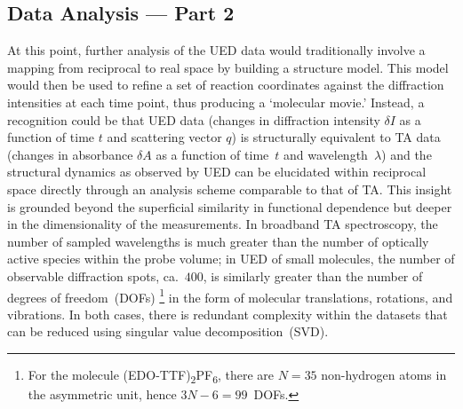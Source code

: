 \subsection{Data Analysis --- Part 2}
\label{sec: UED-data-analysis-2}

At this point, further analysis of the UED data would traditionally involve
a mapping from reciprocal to real space by building a structure model.
This model would then be used to refine a set of reaction coordinates against
the diffraction intensities at each time point, thus producing a `molecular movie.'
%
Instead, a recognition could be that UED data
(changes in diffraction intensity $\delta I$ as a function of time $t$ and scattering vector $q$)
is structurally equivalent to TA data (changes in absorbance $\delta A$ as a function of time~$t$ and wavelength~$\lambda$)
and the structural dynamics as observed by UED can be elucidated within reciprocal space directly
through an analysis scheme comparable to that of TA.
%
This insight is grounded beyond the superficial similarity in functional dependence
but deeper in the dimensionality of the measurements.
%
In broadband TA spectroscopy, the number of sampled wavelengths is much greater than
the number of optically active species within the probe volume;
in UED of small molecules,
the number of observable diffraction spots, ca.~$400$, is similarly greater than
the number of degrees of freedom~(DOFs)%
\footnote{For the molecule (EDO-TTF)\textsubscript{2}PF\textsubscript{6},
there are $N = 35$ non-hydrogen atoms in the asymmetric unit, hence $3N-6 = 99$~DOFs.}
in the form of molecular translations, rotations, and vibrations.
In both cases, there is redundant complexity within the datasets that can be reduced
using singular value decomposition~(SVD).

